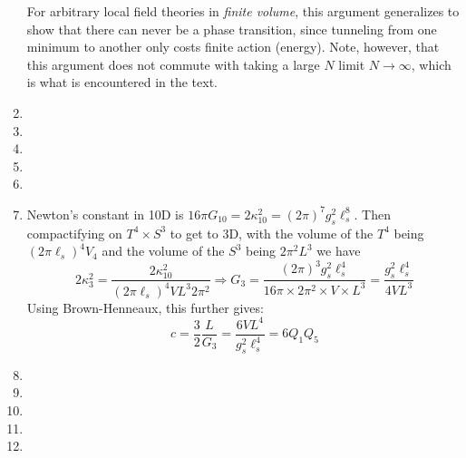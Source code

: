 \documentclass[11pt, class=article, crop=false]{standalone}
\begin{document}
\begin{enumerate}
	For arbitrary local field theories in \emph{finite volume}, this argument generalizes to show that there can never be a phase transition, since tunneling from one minimum to another only costs finite action (energy). Note, however, that this argument does not commute with taking a large $N$ limit $N \to \infty$, which is what is encountered in the text. 
	
	\item 
	
	\item 
	
	\item 
	
	\item 
	
	\item 
	
	\item Newton's constant in 10D is $16\pi G_{10} = 2 \kappa_{10}^2 = (2\pi)^7 g_s^2 \ell_s^8$. Then compactifying on $T^4 \times S^3$ to get to 3D, with the volume of the $T^4$ being $(2\pi \ell_s)^4 V_4$ and the volume of the $S^3$ being $2 \pi^2 L^3$ we have
	\[
		2 \kappa_{3}^2 = \frac{2 \kappa_{10}^2}{(2 \pi \ell_s)^4 V L^3 2 \pi^2} \Rightarrow G_3 = \frac{(2\pi)^3 g_s^2 \ell_s^4}{16 \pi \times 2 \pi^2 \times V \times L^3} = \frac{g_s^2 \ell_s^4}{4 V L^3}
	\]
	Using Brown-Henneaux, this further gives:
	\[
		c = \frac32 \frac{L}{G_3} = \frac{6 V L^4}{g_s^2 \ell_s^4} = 6 Q_1 Q_5
	\]
	\item 
	
	\item
	
	\item 
	
	\item
	
	\item
	
\end{enumerate}

\end{document}
